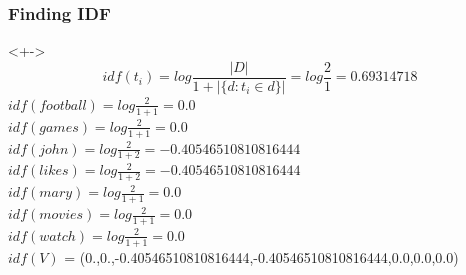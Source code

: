 \documentclass[serif,11pt,aspectratio=1610,table]{beamer}
\begin{document}
\begin{frame}[fragile]
 \frametitle{Finding IDF}
\begin{block}<+->{}
 \begin{displaymath}
  idf(t_{i}) = log \frac{|D|}{1+|\{d : t_{i} \in d\}|} = log \frac{2}{1} = 0.69314718
 \end{displaymath}
\footnotesize
$idf(football) = log \frac{2}{1+1} = 0.0 $ \\
$idf(games) = log \frac{2}{1+1} = 0.0 $ \\
$idf(john) = log \frac{2}{1+2} = -0.40546510810816444 $ \\
$idf(likes) = log \frac{2}{1+2} = -0.40546510810816444 $ \\
$idf(mary) = log \frac{2}{1+1} = 0.0 $ \\
$idf(movies) = log \frac{2}{1+1} = 0.0 $ \\
$idf(watch) = log \frac{2}{1+1} = 0.0 $ \\
$idf(V)$ = (0.,0.,-0.40546510810816444,-0.40546510810816444,0.0,0.0,0.0)

\end{block}

\end{frame}


\end{document}
